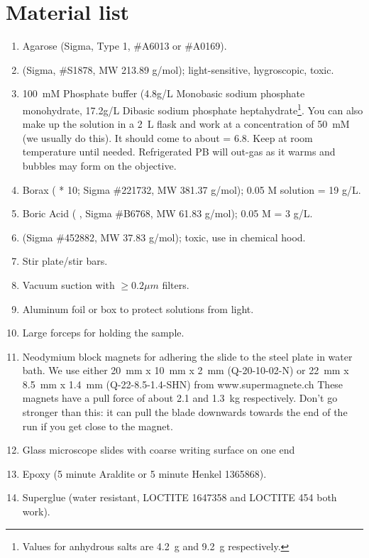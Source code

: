\documentclass[paper=a4, fontsize=11pt]{scrartcl} %
\numberwithin{equation}{section} %
\numberwithin{figure}{section} %
\numberwithin{table}{section} %
\begin{document}
\section{Material list}
\begin{enumerate}
\item Agarose (Sigma, Type 1, \#A6013 or \#A0169).
\item {} (Sigma, \#S1878, MW 213.89 g/mol); light-sensitive, hygroscopic, toxic.
\item 100~mM Phosphate buffer (4.8g/L Monobasic sodium phosphate monohydrate, 17.2g/L Dibasic sodium phosphate heptahydrate\footnote{Values for anhydrous salts are 4.2~g and 9.2~g respectively.}. You can also make up the solution in a 2~L flask and work at a concentration of 50~mM (we usually do this). 
It should come to about \pH = 6.8.
Keep at room temperature until needed. 
Refrigerated PB will out-gas as it warms and bubbles may form on the objective. 
\item Borax ( * 10; Sigma \#221732, MW 381.37 g/mol); 0.05 M solution = 19 g/L.
\item Boric Acid ( , Sigma \#B6768, MW 61.83 g/mol); 0.05 M = 3 g/L.
\item {} (Sigma \#452882, MW 37.83 g/mol); toxic, use in chemical hood.
\item Stir plate/stir bars.
\item Vacuum suction with $\ge 0.2 \mu m$ filters.
\item Aluminum foil or box to protect solutions from light. 
\item Large forceps for holding the sample. 
\item Neodymium block magnets for adhering the slide to the steel plate in water bath. 
      We use either 20~mm x 10~mm x 2~mm (Q-20-10-02-N) or 22~mm x 8.5~mm x 1.4~mm (Q-22-8.5-1.4-SHN) from www.supermagnete.ch
      These magnets have a pull force of about 2.1 and 1.3~kg respectively.
      Don't go stronger than this: it can pull the blade downwards towards the end of the run if you get close to the magnet.
\item Glass microscope slides with coarse writing surface on one end
\item Epoxy (5 minute Araldite or 5 minute Henkel 1365868).
\item Superglue (water resistant, LOCTITE 1647358 and LOCTITE 454 both work).
\end{enumerate}
\end{document}
